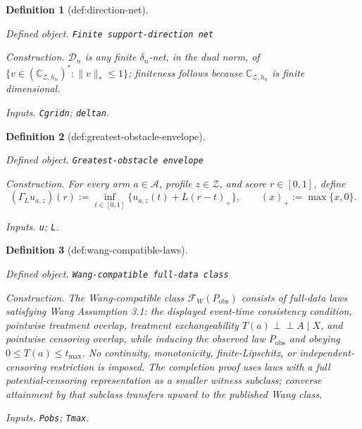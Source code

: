 \documentclass{article}
\newtheorem{definition}{Definition}
\begin{document}
\begin{definition}[def:direction-net]\label{def:direction-net}
\par\smallskip\noindent\emph{Defined object.} \texttt{Finite support-\allowbreak{}direction net}
\par\smallskip\noindent\emph{Construction.} \(\mathcal D_n\) is any finite \(\delta_n\)-net, in the dual norm, of \(\{v\in(\mathbb C_{\mathcal Z,h_n})^*:\|v\|_*\le1\}\); finiteness follows because \(\mathbb C_{\mathcal Z,h_n}\) is finite dimensional.
\par\smallskip\noindent\emph{Inputs.} \texttt{Cgridn}; \texttt{deltan}.
\end{definition}

\begin{definition}[def:greatest-obstacle-envelope]\label{def:greatest-obstacle-envelope}
\par\smallskip\noindent\emph{Defined object.} \texttt{Greatest-\allowbreak{}obstacle envelope}
\par\smallskip\noindent\emph{Construction.} For every arm \(a\in\mathcal A\), profile \(z\in\mathcal Z\), and score \(r\in[0,1]\), define
\[
(\Gamma_Lu_{a,z})(r)
:=\inf_{t\in[0,1]}\{u_{a,z}(t)+L(r-t)_+\},
\qquad (x)_+:=\max\{x,0\}.
\]
\par\smallskip\noindent\emph{Inputs.} \texttt{u}; \texttt{L}.
\end{definition}

\begin{definition}[def:wang-compatible-laws]\label{def:wang-compatible-laws}
\par\smallskip\noindent\emph{Defined object.} \texttt{Wang-\allowbreak{}compatible full-\allowbreak{}data class}
\par\smallskip\noindent\emph{Construction.} The Wang-compatible class \(\mathcal F_W(P_{\mathrm{obs}})\) consists of full-data laws satisfying Wang Assumption 3.1: the displayed event-time consistency condition, pointwise treatment overlap, treatment exchangeability \(T(a)\perp\!\!\!\perp A\mid X\), and pointwise censoring overlap, while inducing the observed law \(P_{\mathrm{obs}}\) and obeying \(0\le T(a)\le t_{\max}\). No continuity, monotonicity, finite-Lipschitz, or independent-censoring restriction is imposed. The completion proof uses laws with a full potential-censoring representation as a smaller witness subclass; converse attainment by that subclass transfers upward to the published Wang class.
\par\smallskip\noindent\emph{Inputs.} \texttt{Pobs}; \texttt{Tmax}.
\end{definition}
\end{document}
